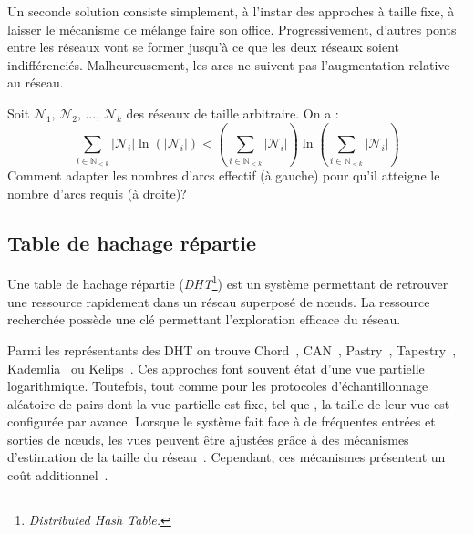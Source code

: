 \noindent Un seconde solution consiste simplement, à l'instar des approches à
taille fixe, à laisser le mécanisme de mélange faire son office. Progressivement,
d'autres ponts entre les réseaux vont se former jusqu'à ce que les deux réseaux
soient indifférenciés. Malheureusement, les arcs ne suivent pas l'augmentation
relative au réseau.

\begin{problem}
  Soit $\mathcal{N}_1,\, \mathcal{N}_2,\, \ldots ,\, \mathcal{N}_k$ des réseaux
  de taille arbitraire. On a :
\begin{equation}
  \sum\limits_{i \in \mathbb{N}_{<k}} |\mathcal{N}_i|\ln (|\mathcal{N}_i|) < (\sum\limits_{i \in \mathbb{N}_{<k}} |\mathcal{N}_i|)\ln{(\sum\limits_{i \in \mathbb{N}_{<k}} |\mathcal{N}_i|)}
\end{equation}
Comment adapter les nombres d'arcs effectif (à gauche) pour qu'il atteigne le
nombre d'arcs requis (à droite)?
\end{problem}



\subsection{Table de hachage répartie}

Une table de hachage répartie (\emph{DHT}\footnote{\emph{Distributed Hash
    Table.}}) est un système permettant de retrouver une ressource rapidement
dans un réseau superposé de nœuds. La ressource recherchée possède une clé
permettant l'exploration efficace du réseau.

Parmi les représentants des DHT on trouve Chord~\cite{stoica2001chord},
CAN~\cite{ratnasamy2001scalable}, Pastry~\cite{rowstron2001pastry},
Tapestry~\cite{zhao2006tapestry}, Kademlia~\cite{maymounkov2002kademlia} ou
Kelips~\cite{gupta2003kelips}.  Ces approches font souvent état d'une vue
partielle logarithmique.  Toutefois, tout comme pour les protocoles
d'échantillonnage aléatoire de pairs dont la vue partielle est fixe, tel que
\CYCLON, la taille de leur vue est configurée par avance. Lorsque le système
fait face à de fréquentes entrées et sorties de nœuds, les vues peuvent être
ajustées grâce à des mécanismes d'estimation de la taille du
réseau~\cite{camarillo2014self, ghinita2006adaptive}. Cependant, ces mécanismes
présentent un coût additionnel~\cite{ghinita2006adaptive}.

